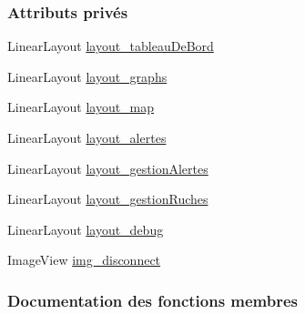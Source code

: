 \subsubsection*{Attributs privés}
\begin{DoxyCompactItemize}
\item 
Linear\+Layout \hyperlink{classfr_1_1campus_1_1laurainc_1_1honeybee_1_1home_activity_add46240b2690229c03b49cffa3ba76bb}{layout\+\_\+tableau\+De\+Bord}
\item 
Linear\+Layout \hyperlink{classfr_1_1campus_1_1laurainc_1_1honeybee_1_1home_activity_acb650487a892f3446ae3f58ef01733b7}{layout\+\_\+graphs}
\item 
Linear\+Layout \hyperlink{classfr_1_1campus_1_1laurainc_1_1honeybee_1_1home_activity_a12f9873ae11f7d8e187600d58406c4da}{layout\+\_\+map}
\item 
Linear\+Layout \hyperlink{classfr_1_1campus_1_1laurainc_1_1honeybee_1_1home_activity_aee95283002ad6087e895fa0fa51c5030}{layout\+\_\+alertes}
\item 
Linear\+Layout \hyperlink{classfr_1_1campus_1_1laurainc_1_1honeybee_1_1home_activity_a6502d793c6b5c6df0c3b051b2bacab9b}{layout\+\_\+gestion\+Alertes}
\item 
Linear\+Layout \hyperlink{classfr_1_1campus_1_1laurainc_1_1honeybee_1_1home_activity_aea8efb6a37f29b1a122844dcd3e26c0b}{layout\+\_\+gestion\+Ruches}
\item 
Linear\+Layout \hyperlink{classfr_1_1campus_1_1laurainc_1_1honeybee_1_1home_activity_a513adcf5f7471faf27a0e7a2798caf56}{layout\+\_\+debug}
\item 
Image\+View \hyperlink{classfr_1_1campus_1_1laurainc_1_1honeybee_1_1home_activity_ae29a1e0dd983c9e9f5554d37d6fc763e}{img\+\_\+disconnect}
\end{DoxyCompactItemize}


\subsubsection{Documentation des fonctions membres}
\mbox{\label{classfr_1_1campus_1_1laurainc_1_1honeybee_1_1home_activity_a2fbd2e53b0138742f01d58ee454fb502}} 
